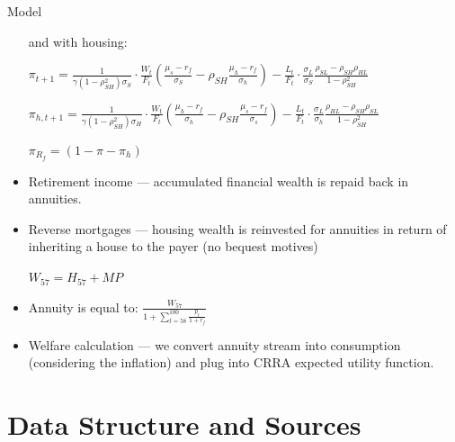 \documentclass{beamer}
\begin{document}
\begin{frame}[allowframebreaks]{Model}
\begin{itemize}
	and with housing:

\begin{center}
	$\pi_{t+1} = \frac{1}{\gamma (1 - \rho^2_{SH}) \sigma_S} \cdot \frac{W_t}{F_t} \left( \frac{\mu_s - r_f}{\sigma_S} - \rho_{SH} \frac{\mu_h - r_f}{\sigma_h} \right) - \frac{L_t}{F_t} \cdot \frac{\sigma_L}{\sigma_S} \frac{\rho_{SL} - \rho_{SH}\rho_{HL}}{1 - \rho^2_{SH}}$
\end{center}
\begin{center}
	$\pi_{h,t+1} = \frac{1}{\gamma (1 - \rho^2_{SH}) \sigma_H} \cdot \frac{W_t}{F_t} \left( \frac{\mu_h - r_f}{\sigma_h} - \rho_{SH} \frac{\mu_s - r_f}{\sigma_s} \right) - \frac{L_t}{F_t} \cdot \frac{\sigma_L}{\sigma_h} \frac{\rho_{HL} - \rho_{SH}\rho_{SL}}{1 - \rho^2_{SH}}$
\end{center}
\begin{center}
	$\pi_{R_f} = \left( 1 - \pi - \pi_h \right)$
\end{center}

\framebreak
	
	\item Retirement income --- accumulated financial wealth is repaid back in annuities.
	\item Reverse mortgages --- housing wealth is reinvested for annuities in return of inheriting a house to the payer (no bequest motives) 

\begin{center}
	$W_{57} = H_{57} + MP$
\end{center}

	\item Annuity is equal to:
$\frac{W_{57}}{1+\sum^{100}_{t=58} \frac{p_t}{1+r_f}}$ 
	
	\item Welfare calculation --- we convert annuity stream into consumption (considering the inflation) and plug into CRRA expected utility function.

  \end{itemize}
\end{frame}

\section{Data Structure and Sources}
\end{document}
